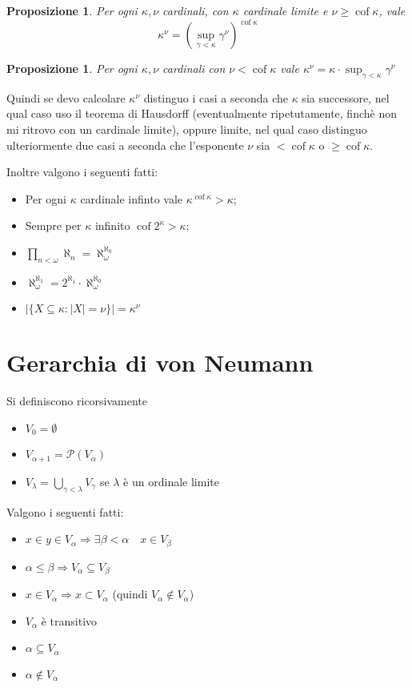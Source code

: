 \documentclass[a4paper,10pt,oneside]{article}
\DeclareMathOperator{\cof}{cof}
\theoremstyle{plain}
\newtheorem{myprop}[mytheorem]{Proposizione}
\theoremstyle{definition}
\theoremstyle{remark}
\begin{document}
\begin{myprop}
 Per ogni $\kappa,\nu$ cardinali, con $\kappa$ cardinale limite e $\nu \ge \cof \kappa$, vale \[\kappa^\nu={\left(\sup_{\gamma<\kappa}\gamma^\nu\right)}^{\cof\kappa}\]
\end{myprop}

\begin{myprop}
 Per ogni $\kappa,\nu$ cardinali con $\nu < \cof \kappa$ vale $\kappa^\nu=\kappa \cdot \sup_{\gamma<\kappa}\gamma^\nu$
\end{myprop}
%
Quindi se devo calcolare $\kappa^\nu$ distinguo i casi a seconda che $\kappa$ sia successore, nel qual caso uso il teorema di Hausdorff (eventualmente ripetutamente, finchè non mi ritrovo con un cardinale limite), oppure limite, nel qual caso distinguo ulteriormente due casi a seconda che l'esponente $\nu$ sia $<\cof \kappa$ o $\ge \cof \kappa$.

Inoltre valgono i seguenti fatti: 

\begin{itemize}
\item Per ogni $\kappa$ cardinale infinto vale $\kappa^{\cof\kappa}>\kappa$;
\item Sempre per $\kappa$ infinito $\cof 2^\kappa>\kappa$;
\item $\prod_{n<\omega}\aleph_n=\aleph_\omega^{\aleph_0}$
\item $\aleph_\omega^{\aleph_1}=2^{\aleph_1}\cdot \aleph_\omega^{\aleph_0}$
\item $|\{X\subseteq \kappa: |X|=\nu\}|=\kappa^\nu$
\end{itemize}

\section{Gerarchia di von Neumann}
Si definiscono ricorsivamente
\begin{itemize}
   \item $V_0 = \emptyset$
   \item $V_{\alpha +1}=\mathcal{P}(V_\alpha)$
   \item $V_{\lambda}=\bigcup_{\gamma<\lambda}V_\gamma$ se $\lambda$ è un ordinale limite
\end{itemize}
Valgono i seguenti fatti:
\begin{itemize}
  \item $x\in y\in V_\alpha \Rightarrow \exists \beta <\alpha \quad x \in V_\beta$
  \item $\alpha\le\beta \Rightarrow V_\alpha\subseteq V_\beta$
  \item $x\in V_\alpha \Rightarrow x \subset V_\alpha$ (quindi $V_\alpha \notin V_\alpha$)
  \item $V_\alpha$ è transitivo
  \item $\alpha \subseteq V_\alpha$
  \item $\alpha \notin V_\alpha$
\end{itemize}
\end{document}
